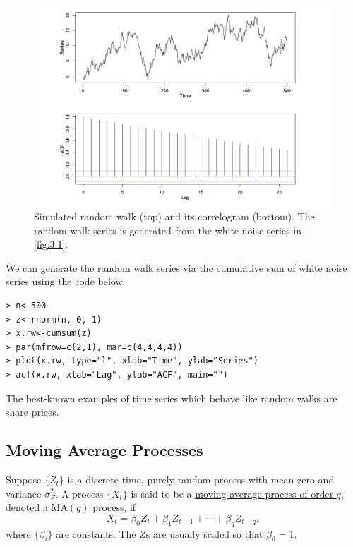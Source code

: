 \begin{figure}[h]
	\centering
	\includegraphics[width=\textwidth]{Chapter 3/fig3-2.png}
	\caption{Simulated random walk (top) and its correlogram (bottom). The random walk series is generated from 
	the white noise series in \cref{fig:3.1}.}
	\label{fig:3.2}
\end{figure}

We can generate the random walk series via the cumulative sum of white noise series using the code below:
\begin{verbatim}
> n<-500
> z<-rnorm(n, 0, 1)
> x.rw<-cumsum(z)
> par(mfrow=c(2,1), mar=c(4,4,4,4))
> plot(x.rw, type="l", xlab="Time", ylab="Series")
> acf(x.rw, xlab="Lag", ylab="ACF", main="")
\end{verbatim}
The best-known examples of time series which behave like random walks are share prices.



\subsection{Moving Average Processes}
\begin{definition*}[]
Suppose $\{ Z_t \}$ is a discrete-time, purely random process with mean zero and variance $\sigma_Z^2$. A 
process $\{ X_t \}$ is said to be a \underline{moving average process of order $q$}, denoted a $\mathrm{MA}(q)$ 
process, if 
\[ X_t = \beta_0Z_t + \beta_1Z_{t-1} + \cdots + \beta_qZ_{t-q}, \]
where $\{ \beta_i \}$ are constants. The $Z$s are usually scaled so that $\beta_0 = 1$.
\end{definition*}


